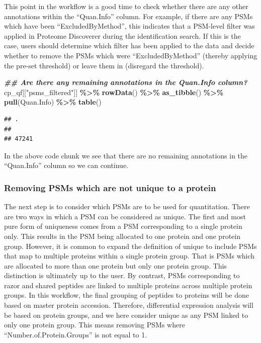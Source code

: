 \documentclass[9pt,a4paper,]{extarticle}
\newenvironment{Shaded}{\begin{snugshade}}{\end{snugshade}}
\newcommand{\DocumentationTok}[1]{\textcolor[rgb]{0.56,0.35,0.01}{\textbf{\textit{#1}}}}
\newcommand{\FunctionTok}[1]{\textcolor[rgb]{0.13,0.29,0.53}{\textbf{#1}}}
\newcommand{\NormalTok}[1]{#1}
\newcommand{\SpecialCharTok}[1]{\textcolor[rgb]{0.81,0.36,0.00}{\textbf{#1}}}
\newcommand{\StringTok}[1]{\textcolor[rgb]{0.31,0.60,0.02}{#1}}
\begin{document}
This point in the workflow is a good time to check whether there are any other
annotations within the ``Quan.Info'' column. For example, if there are any PSMs
which have been ``ExcludedByMethod'', this indicates that a PSM-level filter was
applied in Proteome Discoverer during the identification search. If this is the
case, users should determine which filter has been applied to the data and
decide whether to remove the PSMs which were ``ExcludedByMethod'' (thereby applying
the pre-set threshold) or leave them in (disregard the threshold).

\begin{Shaded}
\begin{Highlighting}[]
\DocumentationTok{\#\# Are there any remaining annotations in the Quan.Info column?}
\NormalTok{cp\_qf[[}\StringTok{"psms\_filtered"}\NormalTok{]] }\SpecialCharTok{\%\textgreater{}\%} 
  \FunctionTok{rowData}\NormalTok{() }\SpecialCharTok{\%\textgreater{}\%} 
  \FunctionTok{as\_tibble}\NormalTok{() }\SpecialCharTok{\%\textgreater{}\%} 
  \FunctionTok{pull}\NormalTok{(Quan.Info) }\SpecialCharTok{\%\textgreater{}\%} 
  \FunctionTok{table}\NormalTok{()}
\end{Highlighting}
\end{Shaded}

\begin{verbatim}
## .
##       
## 47241
\end{verbatim}

In the above code chunk we see that there are no remaining annotations in the
``Quan.Info'' column so we can continue.

\subsubsection{Removing PSMs which are not unique to a protein}\label{removing-psms-which-are-not-unique-to-a-protein}

The next step is to consider which PSMs are to be used for quantitation. There
are two ways in which a PSM can be considered as unique. The first and most pure
form of uniqueness comes from a PSM corresponding to a single protein only. This
results in the PSM being allocated to one protein and one protein group.
However, it is common to expand the definition of unique to include PSMs that
map to multiple proteins within a single protein group. That is PSMs which are
allocated to more than one protein but only one protein group. This distinction
is ultimately up to the user. By contrast, PSMs corresponding to razor and
shared peptides are linked to multiple proteins across multiple protein groups.
In this workflow, the final grouping of peptides to proteins will be done based
on master protein accession. Therefore, differential expression analysis will be
based on protein groups, and we here consider unique as any PSM linked to only
one protein group. This means removing PSMs where ``Number.of.Protein.Groups'' is
not equal to 1.
\end{document}
